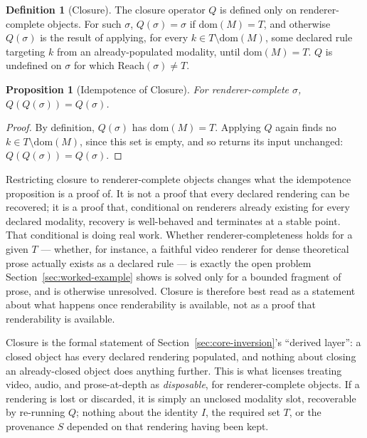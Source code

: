 \documentclass[11pt]{article}
\newtheorem{proposition}[theorem]{Proposition}
\theoremstyle{definition}
\newtheorem{definition}[theorem]{Definition}
\begin{document}
\begin{definition}[Closure]
\label{def:closure}
The closure operator $Q$ is defined only on renderer-complete objects. For such $\sigma$, $Q(\sigma) = \sigma$ if $\mathrm{dom}(M) = T$, and otherwise $Q(\sigma)$ is the result of applying, for every $k \in T \setminus \mathrm{dom}(M)$, some declared rule targeting $k$ from an already-populated modality, until $\mathrm{dom}(M) = T$. $Q$ is undefined on $\sigma$ for which $\mathrm{Reach}(\sigma) \neq T$.
\end{definition}

\begin{proposition}[Idempotence of Closure]
\label{prop:idempotent}
For renderer-complete $\sigma$, $Q(Q(\sigma)) = Q(\sigma)$.
\end{proposition}

\begin{proof}
By definition, $Q(\sigma)$ has $\mathrm{dom}(M) = T$. Applying $Q$ again finds no $k \in T \setminus \mathrm{dom}(M)$, since this set is empty, and so returns its input unchanged: $Q(Q(\sigma)) = Q(\sigma)$.
\end{proof}

Restricting closure to renderer-complete objects changes what the idempotence proposition is a proof of. It is not a proof that every declared rendering can be recovered; it is a proof that, conditional on renderers already existing for every declared modality, recovery is well-behaved and terminates at a stable point. That conditional is doing real work. Whether renderer-completeness holds for a given $T$ --- whether, for instance, a faithful video renderer for dense theoretical prose actually exists as a declared rule --- is exactly the open problem Section~\ref{sec:worked-example} shows is solved only for a bounded fragment of prose, and is otherwise unresolved. Closure is therefore best read as a statement about what happens once renderability is available, not as a proof that renderability is available.

Closure is the formal statement of Section~\ref{sec:core-inversion}'s ``derived layer'': a closed object has every declared rendering populated, and nothing about closing an already-closed object does anything further. This is what licenses treating video, audio, and prose-at-depth as \emph{disposable}, for renderer-complete objects. If a rendering is lost or discarded, it is simply an unclosed modality slot, recoverable by re-running $Q$; nothing about the identity $I$, the required set $T$, or the provenance $S$ depended on that rendering having been kept.
\end{document}
